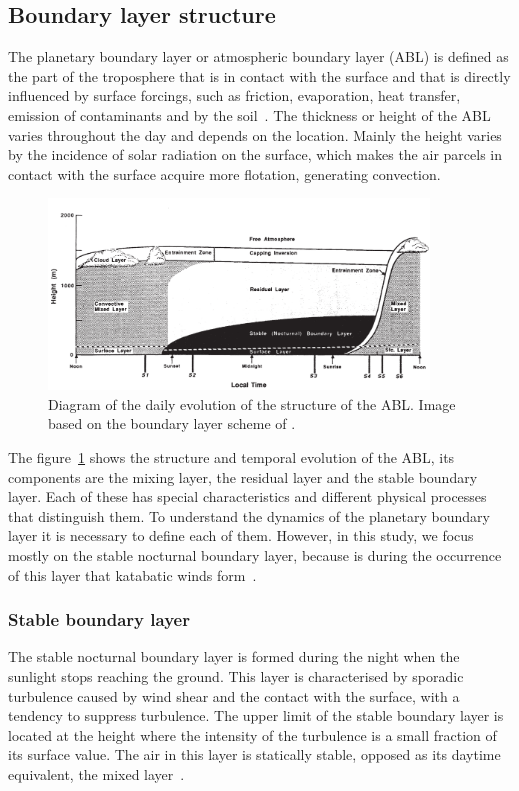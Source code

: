 \documentclass[a4paper,12pt]{article}
\begin{document}
\subsection{Boundary layer structure}
The planetary boundary layer or atmospheric boundary layer (ABL) is defined as the part of the troposphere that is in contact with the surface and that is directly influenced by surface forcings, such as friction, evaporation, heat transfer, emission of contaminants and by the soil~\citep{stull2012introduction}. The thickness or height of the ABL varies throughout the day and depends on the location. Mainly the height varies by the incidence of solar radiation on the surface, which makes the air parcels in contact with the surface acquire more flotation, generating convection.

\begin{figure}[ht!]
	\vspace{-5pt}
    \centering
\includegraphics[width=0.9\textwidth]{fig/abl_stull.png}
    \caption{Diagram of the daily evolution of the structure of the ABL. Image based on the boundary layer scheme of \cite{stull2012introduction}.}
    \label{fig:ABL_structure}
  \vspace{-5pt}
\end{figure}

The figure~\ref{fig:ABL_structure} shows the structure and temporal evolution of the ABL, its components are the mixing layer, the residual layer and the stable boundary layer. Each of these has special characteristics and different physical processes that distinguish them. To understand the dynamics of the planetary boundary layer it is necessary to define each of them. However, in this study, we focus mostly on the stable nocturnal boundary layer, because is during the occurrence of this layer that katabatic winds form~\citep{poulos2008observational, stull2012introduction}.

\subsubsection{Stable boundary layer}
The stable nocturnal boundary layer is formed during the night when the sunlight stops reaching the ground. This layer is characterised by sporadic turbulence caused by wind shear and the contact with the surface, with a tendency to suppress turbulence. The upper limit of the stable boundary layer is located at the height where the intensity of the turbulence is a small fraction of its surface value. The air in this layer is statically stable, opposed as its daytime equivalent, the mixed layer~\citep{stull2012introduction}.
\end{document}
